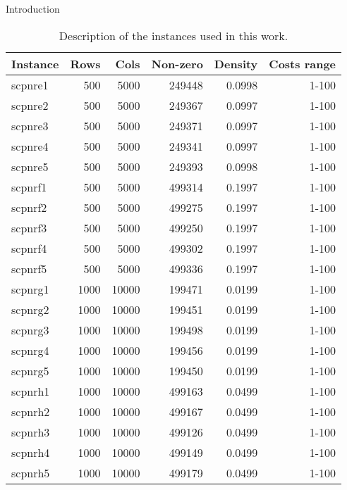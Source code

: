 \documentclass[a4paper,12pt]{mydeitesi_eng}
\begin{document}
\begin{chapter}{Introduction}
\begin{table}[H]
\begin{center}
\begin{tabular}{l|r|r|r|r|r}
\textbf{Instance} & \textbf{Rows} & \textbf{Cols} & \textbf{Non-zero} & \textbf{Density} & \textbf{Costs range}\\
\hline
scpnre1 & 500 & 5000 & 249448 & 0.0998 & 1-100 \\
scpnre2 & 500 & 5000 & 249367 & 0.0997 & 1-100 \\
scpnre3 & 500 & 5000 & 249371 & 0.0997 & 1-100 \\
scpnre4 & 500 & 5000 & 249341 & 0.0997 & 1-100 \\
scpnre5 & 500 & 5000 & 249393 & 0.0998 & 1-100 \\
\hline
scpnrf1 & 500 & 5000 & 499314 & 0.1997 & 1-100 \\
scpnrf2 & 500 & 5000 & 499275 & 0.1997 & 1-100 \\
scpnrf3 & 500 & 5000 & 499250 & 0.1997 & 1-100 \\
scpnrf4 & 500 & 5000 & 499302 & 0.1997 & 1-100 \\
scpnrf5 & 500 & 5000 & 499336 & 0.1997 & 1-100 \\
\hline
scpnrg1 & 1000 & 10000 & 199471 & 0.0199 & 1-100 \\
scpnrg2 & 1000 & 10000 & 199451 & 0.0199 & 1-100 \\
scpnrg3 & 1000 & 10000 & 199498 & 0.0199 & 1-100 \\
scpnrg4 & 1000 & 10000 & 199456 & 0.0199 & 1-100 \\
scpnrg5 & 1000 & 10000 & 199450 & 0.0199 & 1-100 \\
\hline
scpnrh1 & 1000 & 10000 & 499163 & 0.0499 & 1-100 \\
scpnrh2 & 1000 & 10000 & 499167 & 0.0499 & 1-100 \\
scpnrh3 & 1000 & 10000 & 499126 & 0.0499 & 1-100 \\
scpnrh4 & 1000 & 10000 & 499149 & 0.0499 & 1-100 \\
scpnrh5 & 1000 & 10000 & 499179 & 0.0499 & 1-100 \\
\end{tabular}
\end{center}
\caption{Description of the instances used in this work.}
\label{tab:InstancesInfo}
\end{table}
\end{chapter}
\end{document}
